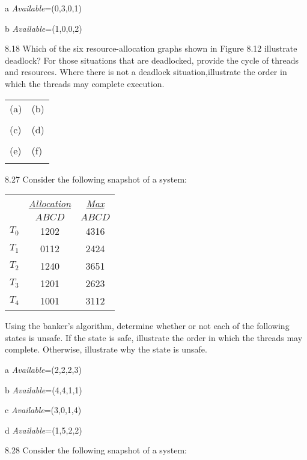 \documentclass[12pt,a4paper]{article}
\newenvironment{problems}{\begin{list}{}{\renewcommand{\makelabel}[1]{\textbf{##1}\hfil}}}{\end{list}}
\newenvironment{steps}{\begin{list}{}{\renewcommand{\makelabel}[1]{##1.\hfil}}}{\end{list}}
\begin{document}
\begin{problems}
   \begin{steps}
       \item[a] \emph{Available}=(0,3,0,1)
       \item[b] \emph{Available}=(1,0,0,2) 
   \end{steps}
    \item[8.18] Which of the six resource-allocation graphs shown in Figure 8.12 illustrate deadlock? For those situations that are deadlocked, provide the cycle of threads and resources. Where there is not a deadlock situation,illustrate the order in which the threads may complete execution.
    
    \begin{tabular}{|l|l|}
        \hline
        (a) & (b)\\
         & \\
        \hline
        (c) & (d)\\
         & \\
        \hline
        (e) & (f)\\
         & \\
        \hline
    \end{tabular}
    \item[8.27] Consider the following snapshot of a system:
     
    \begin{tabular}{ccc}
        & \underline{\emph{Allocation}} & \underline{\emph{Max}} \\
        & $ABCD$ & $ABCD$ \\
   $T_0$ & 1202 & 4316\\
   $T_1$ & 0112 & 2424\\
   $T_2$ & 1240 & 3651\\
   $T_3$ & 1201 & 2623\\
   $T_4$ & 1001 & 3112
   \end{tabular} 

   Using the banker's algorithm, determine whether or not each of the following states is unsafe. If the state is safe, illustrate the order in which the threads may complete. Otherwise, illustrate why the state is unsafe.
   \begin{steps}
    \item[a] \emph{Available}=(2,2,2,3)
    \item[b] \emph{Available}=(4,4,1,1)
    \item[c] \emph{Available}=(3,0,1,4)
    \item[d] \emph{Available}=(1,5,2,2)   
   \end{steps}
    \item[8.28] Consider the following snapshot of a system:
    

\end{problems}
\end{document}
